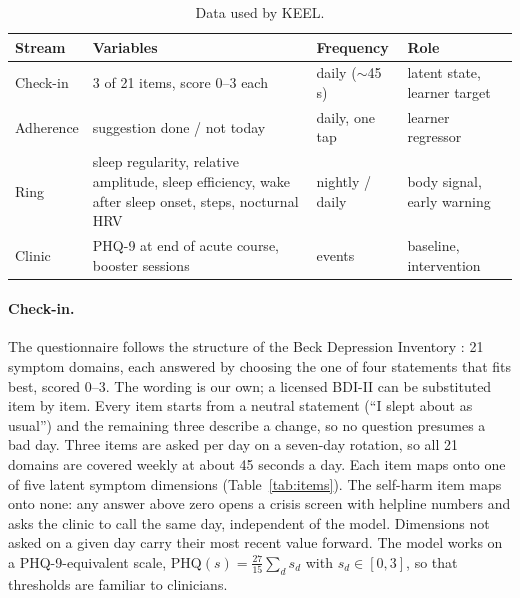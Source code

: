 \documentclass[11pt,a4paper]{article}
\begin{document}
\begin{table}[h]
\centering\small
\begin{tabular}{@{}lp{6.2cm}p{2.3cm}p{3.2cm}@{}}
\toprule
Stream & Variables & Frequency & Role \\
\midrule
Check-in & 3 of 21 items, score 0--3 each & daily ($\sim$45\,s) & latent state, learner target \\
Adherence & suggestion done / not today & daily, one tap & learner regressor \\
Ring & sleep regularity, relative amplitude, sleep efficiency, wake after sleep onset, steps, nocturnal HRV & nightly / daily & body signal, early warning \\
Clinic & PHQ-9 at end of acute course, booster sessions & events & baseline, intervention \\
\bottomrule
\end{tabular}
\caption{Data used by KEEL.}
\label{tab:data}
\end{table}

\paragraph{Check-in.} The questionnaire follows the structure of the Beck Depression Inventory \cite{beck1961,beck1996}: 21 symptom domains, each answered by choosing the one of four statements that fits best, scored 0--3. The wording is our own; a licensed BDI-II can be substituted item by item. Every item starts from a neutral statement (``I slept about as usual'') and the remaining three describe a change, so no question presumes a bad day. Three items are asked per day on a seven-day rotation, so all 21 domains are covered weekly at about 45 seconds a day. Each item maps onto one of five latent symptom dimensions (Table~\ref{tab:items}). The self-harm item maps onto none: any answer above zero opens a crisis screen with helpline numbers and asks the clinic to call the same day, independent of the model. Dimensions not asked on a given day carry their most recent value forward. The model works on a PHQ-9-equivalent scale, $\mathrm{PHQ}(s) = \tfrac{27}{15}\sum_{d} s_d$ with $s_d \in [0,3]$, so that thresholds are familiar to clinicians.
\end{document}
